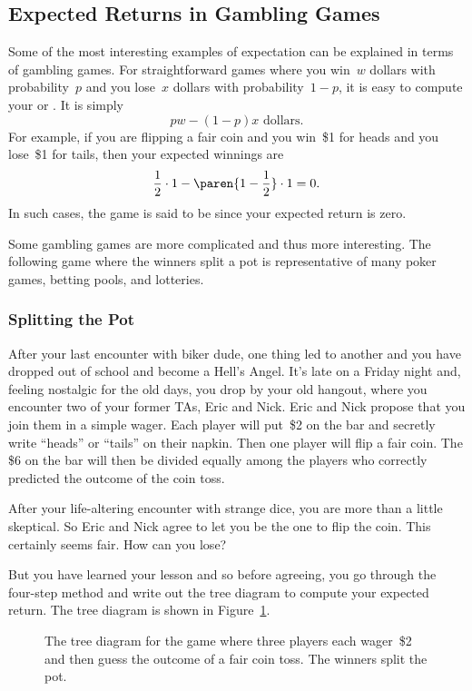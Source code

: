 \subsection{Expected Returns in Gambling Games}

Some of the most interesting examples of expectation can be explained
in terms of gambling games.  For straightforward games where you
win~$w$ dollars with probability~$p$ and you lose~$x$ dollars with
probability~$1 - p$, it is easy to compute your 
or .  It is simply
\[
    p w - (1 - p) x \text{ dollars}.
\]
For example, if you are flipping a fair coin and you win~\$1 for heads
and you lose~\$1 for tails, then your expected winnings are
\[
    \frac{1}{2} \cdot 1 - \paren{1 - \frac{1}{2}} \cdot 1 = 0.
\]
In such cases, the game is said to be  since your expected
return is zero.

Some gambling games are more complicated and thus more interesting.
The following game where the winners split a pot is representative of
many poker games, betting pools, and lotteries.

\subsubsection{Splitting the Pot}

After your last encounter with biker dude, one thing led to another
and you have dropped out of school and become a Hell's Angel.  It's
late on a Friday night and, feeling nostalgic for the old days, you
drop by your old hangout, where you encounter two of your former TAs,
Eric and Nick.  Eric and Nick propose that you join them in a simple
wager. Each player will put~\$2 on the bar and secretly write
``heads'' or ``tails'' on their napkin.  Then one player will flip a
fair coin.   The \$6 on the bar will then be divided
equally among the players who correctly predicted the outcome of the
coin toss.

After your life-altering encounter with strange dice, you are more
than a little skeptical.  So Eric and Nick agree to let you be the one
to flip the coin.  This certainly seems fair.  How can you lose?

But you have learned your lesson and so before agreeing, you go
through the four-step method and write out the tree diagram to compute
your expected return.  The tree diagram is shown in
Figure~\ref{fig:17E1}.

\begin{figure}


\caption{The tree diagram for the game where three players each
  wager~\$2 and then guess the outcome of a fair coin toss.  The
  winners split the pot.}

\label{fig:17E1}

\end{figure}


